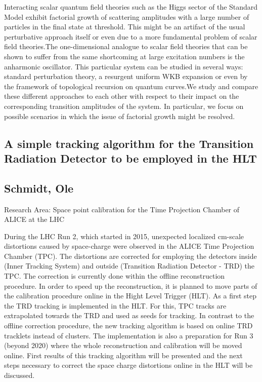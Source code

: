 \noindent Interacting scalar quantum field theories such as the Higgs sector of the Standard Model exhibit factorial growth of scattering amplitudes with a large number of particles in the final state at threshold. This might be an artifact of the usual perturbative approach itself or even due to a more fundamental problem of scalar field theories.\newline The one-dimensional analogue to scalar field theories that can be shown to suffer from the same shortcoming at large excitation numbers is the anharmonic oscillator. This particular system can be studied in several ways: standard perturbation theory, a resurgent uniform WKB expansion or even by the framework of topological recursion on quantum curves.\newline We study and compare these different approaches to each other with respect to their impact on the corresponding transition amplitudes of the system. In particular, we focus on possible scenarios in which the issue of factorial growth might be resolved.

\subsection*{\centering \large A simple tracking algorithm for the Transition Radiation Detector to be employed in the HLT}
\subsection*{\centering \normalsize Schmidt, Ole}
Research Area: Space point calibration for the Time Projection Chamber of ALICE at the LHC \newline

\noindent During the LHC Run 2, which started in 2015, unexpected localized cm-scale distortions caused by space-charge were observed in the ALICE Time Projection Chamber (TPC). The distortions are corrected for employing the detectors inside (Inner Tracking System) and outside (Transition Radiation Detector - TRD) the TPC. The correction is currently done within the offline reconstruction procedure.
\newline
In order to speed up the reconstruction, it is planned to move parts of the calibration procedure online in the Hight Level Trigger (HLT). As a first step the TRD tracking is implemented in the HLT. For this, TPC tracks are extrapolated towards the TRD and used as seeds for tracking. In contrast to the offline correction procedure, the new tracking algorithm is based on online TRD tracklets instead of clusters. The implementation is also a preparation for Run 3 (beyond 2020) where the whole reconstruction and calibration will be moved online. First results of this tracking algorithm will be presented and the next steps necessary to correct the space charge distortions online in the HLT will be discussed. 
\newpage

